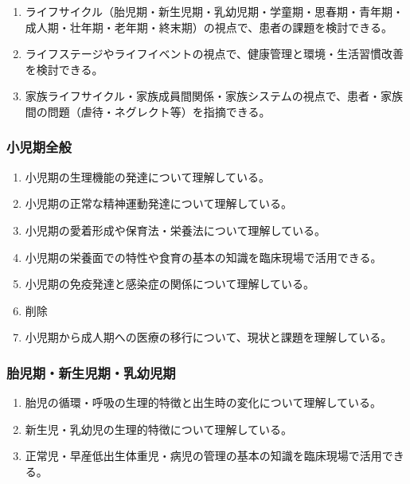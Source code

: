 \documentclass[
]{ltjsarticle}
\providecommand{\tightlist}{%
  \setlength{\itemsep}{0pt}\setlength{\parskip}{0pt}}
\begin{document}
\begin{enumerate}
\def\labelenumi{\arabic{enumi}.}
\tightlist
\item
  ライフサイクル（胎児期・新生児期・乳幼児期・学童期・思春期・青年期・成人期・壮年期・老年期・終末期）の視点で、患者の課題を検討できる。
\item
  ライフステージやライフイベントの視点で、健康管理と環境・生活習慣改善を検討できる。
\item
  家族ライフサイクル・家族成員間関係・家族システムの視点で、患者・家族間の問題（虐待・ネグレクト等）を指摘できる。
\end{enumerate}

\hypertarget{ux5c0fux5150ux671fux5168ux822c}{%
\subsubsection{小児期全般}\label{ux5c0fux5150ux671fux5168ux822c}}

\begin{enumerate}
\def\labelenumi{\arabic{enumi}.}
\tightlist
\item
  小児期の生理機能の発達について理解している。
\item
  小児期の正常な精神運動発達について理解している。
\item
  小児期の愛着形成や保育法・栄養法について理解している。
\item
  小児期の栄養面での特性や食育の基本の知識を臨床現場で活用できる。
\item
  小児期の免疫発達と感染症の関係について理解している。
\item
  削除
\item
  小児期から成人期への医療の移行について、現状と課題を理解している。
\end{enumerate}

\hypertarget{ux80ceux5150ux671fux65b0ux751fux5150ux671fux4e73ux5e7cux5150ux671f}{%
\subsubsection{胎児期・新生児期・乳幼児期}\label{ux80ceux5150ux671fux65b0ux751fux5150ux671fux4e73ux5e7cux5150ux671f}}

\begin{enumerate}
\def\labelenumi{\arabic{enumi}.}
\tightlist
\item
  胎児の循環・呼吸の生理的特徴と出生時の変化について理解している。
\item
  新生児・乳幼児の生理的特徴について理解している。
\item
  正常児・早産低出生体重児・病児の管理の基本の知識を臨床現場で活用できる。
\end{enumerate}
\end{document}
